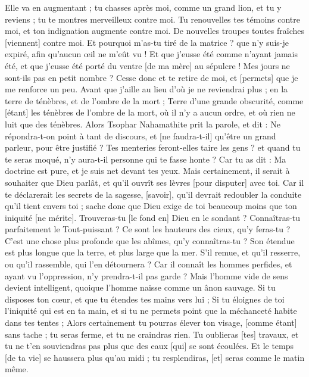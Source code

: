 \begin{multicols}{2}
Elle va en augmentant ; tu chasses après moi, comme un grand lion, et tu y reviens ; tu te montres merveilleux contre moi.
Tu renouvelles tes témoins contre moi, et ton indignation augmente contre moi. De nouvelles troupes toutes fraîches [viennent] contre moi.
Et pourquoi m'as-tu tiré de la matrice ? que n'y suis-je expiré, afin qu'aucun œil ne m'eût vu !
Et que j'eusse été comme n'ayant jamais été, et que j'eusse été porté du ventre [de ma mère] au sépulcre !
Mes jours ne sont-ils pas en petit nombre ? Cesse donc et te retire de moi, et [permets] que je me renforce un peu.
Avant que j'aille au lieu d'où je ne reviendrai plus ; en la terre de ténèbres, et de l'ombre de la mort ;
Terre d'une grande obscurité, comme [étant] les ténèbres de l'ombre de la mort, où il n'y a aucun ordre, et où rien ne luit que des ténèbres.
\VerseOne{}Alors Tsophar Nahamathite prit la parole, et dit :
Ne répondra-t-on point à tant de discours, et [ne faudra-t-il] qu'être un grand parleur, pour être justifié ?
Tes menteries feront-elles taire les gens ? et quand tu te seras moqué, n'y aura-t-il personne qui te fasse honte ?
Car tu as dit : Ma doctrine est pure, et je suis net devant tes yeux.
Mais certainement, il serait à souhaiter que Dieu parlât, et qu'il ouvrît ses lèvres [pour disputer] avec toi.
Car il te déclarerait les secrets de la sagesse, [savoir], qu'il devrait redoubler la conduite qu'il tient envers toi ; sache donc que Dieu exige de toi beaucoup moins que ton iniquité [ne mérite].
Trouveras-tu [le fond en] Dieu en le sondant ? Connaîtras-tu parfaitement le Tout-puissant ?
Ce sont les hauteurs des cieux, qu'y feras-tu ? C'est une chose plus profonde que les abîmes, qu'y connaîtras-tu ?
Son étendue est plus longue que la terre, et plus large que la mer.
S'il remue, et qu'il resserre, ou qu'il rassemble, qui l'en détournera ?
Car il connaît les hommes perfides, et ayant vu l'oppression, n'y prendra-t-il pas garde ?
Mais l'homme vide de sens devient intelligent, quoique l'homme naisse comme un ânon sauvage.
Si tu disposes ton cœur, et que tu étendes tes mains vers lui ;
Si tu éloignes de toi l'iniquité qui est en ta main, et si tu ne permets point que la méchanceté habite dans tes tentes ;
Alors certainement tu pourras élever ton visage, [comme étant] sans tache ; tu seras ferme, et tu ne craindras rien.
Tu oublieras [tes] travaux, et tu ne t'en souviendras pas plus que des eaux [qui] se sont écoulées.
Et le temps [de ta vie] se haussera plus qu'au midi ; tu resplendiras, [et] seras comme le matin même.

\end{multicols}
